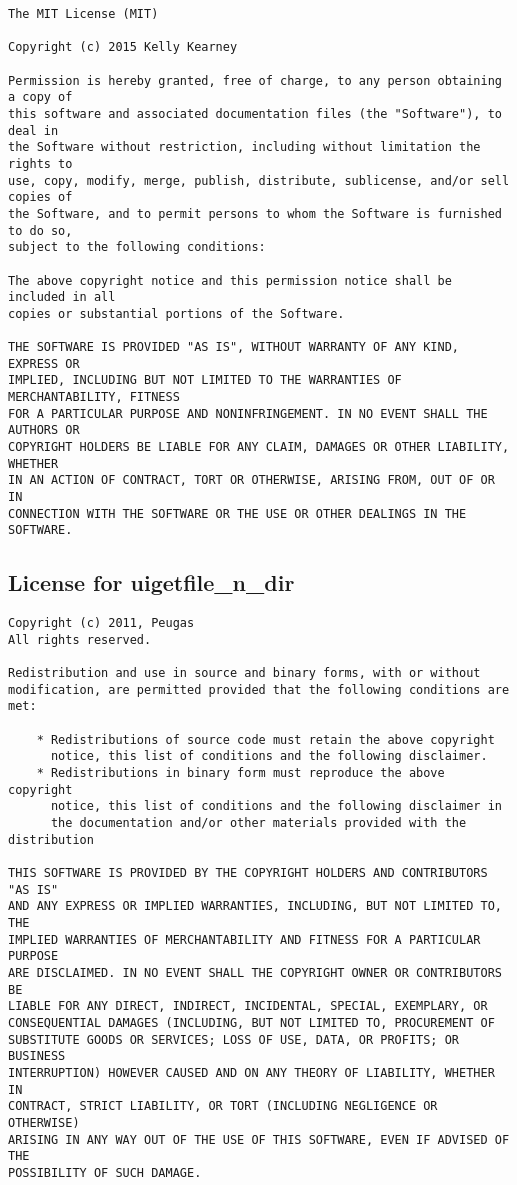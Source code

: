 \documentclass[a4paper, oneside, onecolumn, 11pt]{article}
\begin{document}
\begingroup
\footnotesize
\begin{verbatim}
The MIT License (MIT)

Copyright (c) 2015 Kelly Kearney

Permission is hereby granted, free of charge, to any person obtaining a copy of
this software and associated documentation files (the "Software"), to deal in
the Software without restriction, including without limitation the rights to
use, copy, modify, merge, publish, distribute, sublicense, and/or sell copies of
the Software, and to permit persons to whom the Software is furnished to do so,
subject to the following conditions:

The above copyright notice and this permission notice shall be included in all
copies or substantial portions of the Software.

THE SOFTWARE IS PROVIDED "AS IS", WITHOUT WARRANTY OF ANY KIND, EXPRESS OR
IMPLIED, INCLUDING BUT NOT LIMITED TO THE WARRANTIES OF MERCHANTABILITY, FITNESS
FOR A PARTICULAR PURPOSE AND NONINFRINGEMENT. IN NO EVENT SHALL THE AUTHORS OR
COPYRIGHT HOLDERS BE LIABLE FOR ANY CLAIM, DAMAGES OR OTHER LIABILITY, WHETHER
IN AN ACTION OF CONTRACT, TORT OR OTHERWISE, ARISING FROM, OUT OF OR IN
CONNECTION WITH THE SOFTWARE OR THE USE OR OTHER DEALINGS IN THE SOFTWARE.
\end{verbatim}
\endgroup

\subsection{License for uigetfile\_n\_dir}
\label{sec:uigetfile}

\begingroup
\footnotesize
\begin{verbatim}
Copyright (c) 2011, Peugas
All rights reserved.

Redistribution and use in source and binary forms, with or without
modification, are permitted provided that the following conditions are
met:

    * Redistributions of source code must retain the above copyright
      notice, this list of conditions and the following disclaimer.
    * Redistributions in binary form must reproduce the above copyright
      notice, this list of conditions and the following disclaimer in
      the documentation and/or other materials provided with the distribution

THIS SOFTWARE IS PROVIDED BY THE COPYRIGHT HOLDERS AND CONTRIBUTORS "AS IS"
AND ANY EXPRESS OR IMPLIED WARRANTIES, INCLUDING, BUT NOT LIMITED TO, THE
IMPLIED WARRANTIES OF MERCHANTABILITY AND FITNESS FOR A PARTICULAR PURPOSE
ARE DISCLAIMED. IN NO EVENT SHALL THE COPYRIGHT OWNER OR CONTRIBUTORS BE
LIABLE FOR ANY DIRECT, INDIRECT, INCIDENTAL, SPECIAL, EXEMPLARY, OR
CONSEQUENTIAL DAMAGES (INCLUDING, BUT NOT LIMITED TO, PROCUREMENT OF
SUBSTITUTE GOODS OR SERVICES; LOSS OF USE, DATA, OR PROFITS; OR BUSINESS
INTERRUPTION) HOWEVER CAUSED AND ON ANY THEORY OF LIABILITY, WHETHER IN
CONTRACT, STRICT LIABILITY, OR TORT (INCLUDING NEGLIGENCE OR OTHERWISE)
ARISING IN ANY WAY OUT OF THE USE OF THIS SOFTWARE, EVEN IF ADVISED OF THE
POSSIBILITY OF SUCH DAMAGE.
\end{verbatim}
\endgroup


\end{document}
